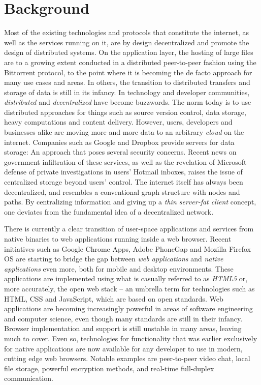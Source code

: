 \section{Background}

Most of the existing technologies and protocols that constitute the internet, as well as the services running on it, are by design decentralized and promote the design of distributed systems\cite{InternetDecenterlized:Online}. On the application layer, the hosting of large files are to a growing extent conducted in a distributed peer-to-peer fashion using the Bittorrent protocol, to the point where it is becoming the de facto approach for many use cases and areas. In others, the transition to distributed transfers and storage of data is still in its infancy. In technology and developer communities, \emph{distributed} and \emph{decentralized} have become buzzwords. The norm today is to use distributed approaches for things such as source version control, data storage, heavy computations and content delivery.
However, users, developers and businesses alike are moving more and more data to an arbitrary \emph{cloud} on the internet. Companies such as Google and Dropbox provide servers for data storage: An approach that poses several security concerns. Recent news on government infiltration of these services, as well as the revelation of Microsoft defense of private investigations in users' Hotmail inboxes, raises the issue of centralized storage beyond users' control. The internet itself has always been decentralized, and resembles a conventional graph structure with nodes and paths. By centralizing information and giving up a \emph{thin server-fat client} concept, one deviates from the fundamental idea of a decentralized network.


There is currently a clear transition of user-space applications and services from native binaries to web applications running inside a web browser. Recent initiatives such as Google Chrome Apps, Adobe PhoneGap and Mozilla Firefox OS are starting to bridge the gap between \emph{web applications} and \emph{native applications} even more, both for mobile and desktop environments. These applications are implemented using what is casually referred to as \emph{HTML5} or, more accurately, the open web stack – an umbrella term for technologies such as HTML, CSS and JavaScript, which are based on open standards. Web applications are becoming increasingly powerful in areas of software engineering and computer science, even though many standards are still in their infancy. Browser implementation and support is still unstable in many areas, leaving much to cover. Even so, technologies for functionality that was earlier exclusively for native applications are now available for any developer to use in modern, cutting edge web browsers. Notable examples are peer-to-peer video chat, local file storage, powerful encryption methods, and real-time full-duplex communication.

